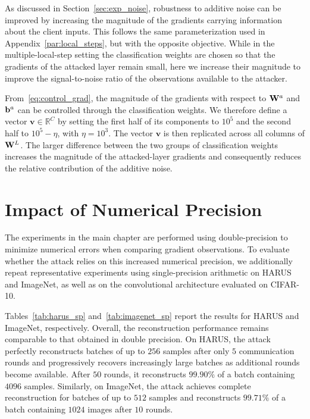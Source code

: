 As discussed in Section~\ref{sec:exp_noise}, robustness to additive noise can be improved by increasing the magnitude of the gradients carrying information about the client inputs. This follows the same parameterization used in Appendix~\ref{par:local_steps}, but with the opposite objective. While in the multiple-local-step setting the classification weights are chosen so that the gradients of the attacked layer remain small, here we increase their magnitude to improve the signal-to-noise ratio of the observations available to the attacker.

From~\eqref{eq:control_grad}, the magnitude of the gradients with respect to $\mathbf{W}^{a}$ and ${\mathbf{b}}^{a}$ can be controlled through the classification weights. We therefore define a vector $\mathbf{v}\in\mathbb{R}^{C}$ by setting the first half of its components to $10^5$ and the second half to $10^5-\eta$, with $\eta=10^3$. The vector $\mathbf{v}$ is then replicated across all columns of $\mathbf{W}^{L}$. The larger difference between the two groups of classification weights increases the magnitude of the attacked-layer gradients and consequently reduces the relative contribution of the additive noise.

\section{Impact of Numerical Precision}

\label{app:add_res}

The experiments in the main chapter are performed using double-precision to minimize numerical errors when comparing gradient observations. To evaluate whether the attack relies on this increased numerical precision, we additionally repeat representative experiments using single-precision arithmetic on HARUS and ImageNet, as well as on the convolutional architecture evaluated on CIFAR-10.

Tables~\ref{tab:harus_sp} and~\ref{tab:imagenet_sp} report the results for HARUS and ImageNet, respectively. Overall, the reconstruction performance remains comparable to that obtained in double precision. On HARUS, the attack perfectly reconstructs batches of up to $256$ samples after only $5$ communication rounds and progressively recovers increasingly large batches as additional rounds become available. After $50$ rounds, it reconstructs $99.90\%$ of a batch containing $4096$ samples. Similarly, on ImageNet, the attack achieves complete reconstruction for batches of up to $512$ samples and reconstructs $99.71\%$ of a batch containing $1024$ images after $10$ rounds.

